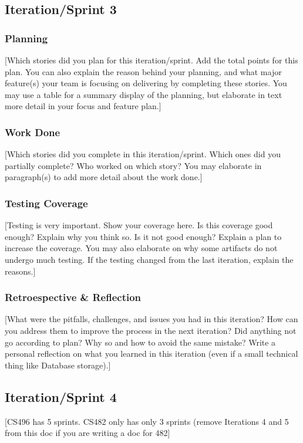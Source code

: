 \documentclass{article}
\begin{document}
\subsection{Iteration/Sprint 3}
\subsubsection{Planning}
[Which stories did you plan for this iteration/sprint. Add the total points for this plan. You can also explain the reason behind your planning, and what major feature(s) your team is focusing on delivering by completing these stories. You may use a table for a summary display of the planning, but elaborate in text more detail in your focus and feature plan.]

\subsubsection{Work Done}
[Which stories did you complete in this iteration/sprint. Which ones did you partially complete? Who worked on which story? You may elaborate in paragraph(s) to add more detail about the work done.]

\subsubsection{Testing Coverage}
[Testing is very important. Show your coverage here. Is this coverage good enough? Explain why you think so. Is it not good enough? Explain a plan to increase the coverage. You may also elaborate on why some artifacts do not undergo much testing. If the testing changed from the last iteration, explain the reasons.]

\subsubsection{Retroespective \& Reflection}
[What were the pitfalls, challenges, and issues you had in this iteration? How can you address them to improve the process in the next iteration? Did anything not go according to plan? Why so and how to avoid the same mistake? Write a personal reflection on what you learned in this iteration (even if a small technical thing like Database storage).]

\subsection{Iteration/Sprint 4}
[CS496 has 5 sprints. CS482 only has only 3 sprints (remove Iterations 4 and 5 from this doc if you are writing a doc for 482]
\end{document}
